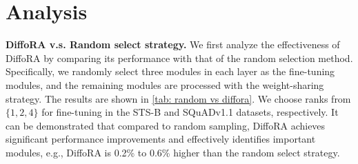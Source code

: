 
\vspace{-.18em}
\section{Analysis}

\noindent\textbf{DiffoRA v.s. Random select strategy.}
%
We first analyze the effectiveness of DiffoRA by comparing its performance with that of the random selection method. 
Specifically, we randomly select three modules in each layer as the fine-tuning modules, and the remaining modules are processed with the weight-sharing strategy.
%
The results are shown in \cref{tab: random vs diffora}.
We choose ranks from $\{1, 2, 4\}$ for fine-tuning in the STS-B and SQuADv1.1 datasets, respectively.
It can be demonstrated that compared to random sampling, DiffoRA achieves significant performance improvements and effectively identifies important modules, e.g., DiffoRA is 0.2\% to 0.6\% higher than the random select strategy.  

